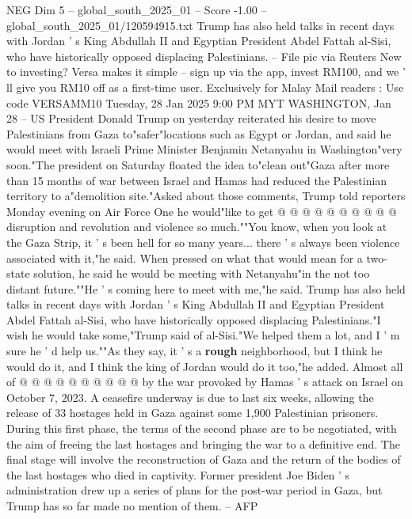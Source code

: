 \begin{textsample}{NEG Dim 5 – global\_south\_2025\_01 – Score -1.00 – global\_south\_2025\_01/120594915.txt}  \label{ex:f5_neg_101}
Trump has also held talks in recent days with Jordan ' s King Abdullah II and Egyptian President Abdel Fattah al-Sisi, who have historically opposed displacing Palestinians. -- File pic via Reuters New to investing?
Versa makes it simple -- sign up via the app, invest RM100, and we ' ll give you RM10 off as a first-time user.
Exclusively for Malay Mail readers : Use code VERSAMM10 Tuesday, 28 Jan 2025 9:00 PM MYT WASHINGTON, Jan 28 -- US President Donald Trump on yesterday reiterated his desire to move Palestinians from Gaza to"safer"locations such as Egypt or Jordan, and said he would meet with Israeli Prime Minister Benjamin Netanyahu in Washington"very soon."The president on Saturday floated the idea to"clean out"Gaza after more than 15 months of war between Israel and Hamas had reduced the Palestinian territory to a"demolition site."Asked about those comments, Trump told reporters Monday evening on Air Force One he would"like to get @ @ @ @ @ @ @ @ @ @ disruption and revolution and violence so much.""You know, when you look at the Gaza Strip, it ' s been hell for so many years... there ' s always been violence associated with it,"he said.
When pressed on what that would mean for a two-state solution, he said he would be meeting with Netanyahu"in the not too distant future.""He ' s coming here to meet with me,"he said.
Trump has also held talks in recent days with Jordan ' s King Abdullah II and Egyptian President Abdel Fattah al-Sisi, who have historically opposed displacing Palestinians."I wish he would take some,"Trump said of al-Sisi."We helped them a lot, and I ' m sure he ' d help us.""As they say, it ' s a \textbf{rough} neighborhood, but I think he would do it, and I think the king of Jordan would do it too,"he added.
Almost all of @ @ @ @ @ @ @ @ @ @ by the war provoked by Hamas ' s attack on Israel on October 7, 2023.
A ceasefire underway is due to last six weeks, allowing the release of 33 hostages held in Gaza against some 1,900 Palestinian prisoners.
During this first phase, the terms of the second phase are to be negotiated, with the aim of freeing the last hostages and bringing the war to a definitive end.
The final stage will involve the reconstruction of Gaza and the return of the bodies of the last hostages who died in captivity.
Former president Joe Biden ' s administration drew up a series of plans for the post-war period in Gaza, but Trump has so far made no mention of them. -- AFP

\end{textsample}
